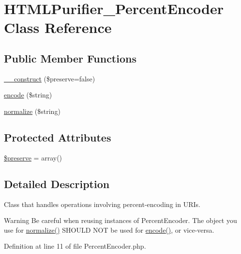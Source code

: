 \hypertarget{classHTMLPurifier__PercentEncoder}{\section{H\+T\+M\+L\+Purifier\+\_\+\+Percent\+Encoder Class Reference}
\label{classHTMLPurifier__PercentEncoder}
}
\subsection*{Public Member Functions}
\begin{DoxyCompactItemize}
\item 
\hyperlink{classHTMLPurifier__PercentEncoder_ac6cd8ef45123e6f5ae5df7ffc71224c7}{\+\_\+\+\_\+construct} (\$preserve=false)
\item 
\hyperlink{classHTMLPurifier__PercentEncoder_a4e827d898aa6f814091993c1a4790d37}{encode} (\$string)
\item 
\hyperlink{classHTMLPurifier__PercentEncoder_a8faf68165d7746c64e8d4459948a9653}{normalize} (\$string)
\end{DoxyCompactItemize}
\subsection*{Protected Attributes}
\begin{DoxyCompactItemize}
\item 
\hyperlink{classHTMLPurifier__PercentEncoder_a671e9bd32d57206df54030b0d57721d6}{\$preserve} = array()
\end{DoxyCompactItemize}


\subsection{Detailed Description}
Class that handles operations involving percent-\/encoding in U\+R\+Is.

\begin{DoxyWarning}{Warning}
Be careful when reusing instances of Percent\+Encoder. The object you use for \hyperlink{classHTMLPurifier__PercentEncoder_a8faf68165d7746c64e8d4459948a9653}{normalize()} S\+H\+O\+U\+L\+D N\+O\+T be used for \hyperlink{classHTMLPurifier__PercentEncoder_a4e827d898aa6f814091993c1a4790d37}{encode()}, or vice-\/versa. 
\end{DoxyWarning}


Definition at line 11 of file Percent\+Encoder.\+php.



